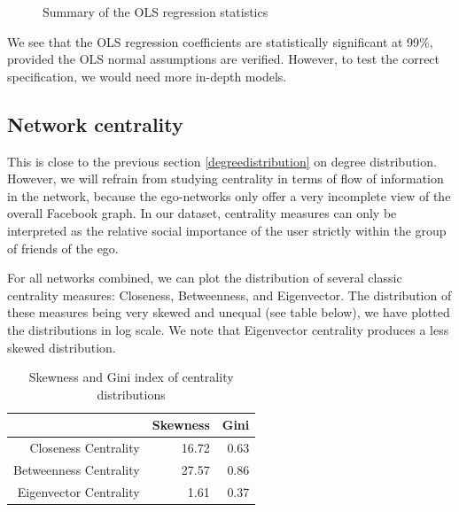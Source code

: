 \documentclass[11pt]{article}       %
\begin{document}
\begin{figure}[H]
\begin{minipage}[b]{0.45\linewidth}
\vspace{0.7cm}
\caption{Summary of the OLS regression statistics}
\end{minipage}
\end{figure}

We see that the OLS regression coefficients are statistically significant at 99\%, provided the OLS normal assumptions are verified. However, to test the correct specification, we would need more in-depth models.

\subsection{Network centrality} \label{networkcentrality}

This is close to the previous section \ref{degreedistribution} on degree distribution. However, we will refrain from studying centrality in terms of flow of information in the network, because the ego-networks only offer a very incomplete view of the overall Facebook graph. In our dataset, centrality measures can only be interpreted as the relative social importance of the user strictly within the group of friends of the ego. 

For all networks combined, we can plot the distribution of several classic centrality measures: Closeness, Betweenness, and Eigenvector. The distribution of these measures being very skewed and unequal (see table below), we have plotted the distributions in log scale. We note that Eigenvector centrality produces a less skewed distribution.

\begin{table}[ht]
\centering
\begin{tabular}{rrr}
  \hline
 & Skewness & Gini \\ 
  \hline
Closeness Centrality & 16.72 & 0.63 \\ 
  Betweenness Centrality & 27.57 & 0.86 \\ 
  Eigenvector Centrality & 1.61 & 0.37 \\ 
   \hline
\end{tabular}
\caption{Skewness and Gini index of centrality distributions}
\end{table}
\end{document}
